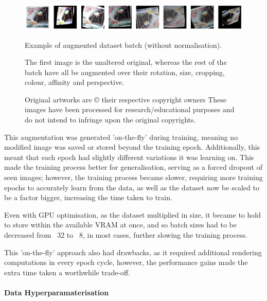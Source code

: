                         \begin{figure}[h]
                            \centering
                            \includegraphics[width=\textwidth]{images/AugmentedArts.png}
                            \caption{Example of augmented dataset batch (without normalisation).}
                            \label{fig:augmentedArts}
                            \caption*{
                                The first image is the unaltered original, whereas the rest of the batch have all be augmented over their rotation, size, cropping, colour, affinity and perspective.
                            }
                            \caption*{
                                Original artworks are © their respective copyright owners
                                \footnotesize These images have been processed for research/educational purposes and do not intend to infringe upon the original copyrights.
                            }
                        \end{figure}
    
                        This augmentation was generated 'on-the-fly' during training, meaning no modified image was saved or stored beyond the training epoch. Additionally, this meant that each epoch had slightly different variations it was learning on. This made the training process better for generalisation, serving as a forced dropout of seen images; however, the training process became slower, requiring more training epochs to accurately learn from the data, as well as the dataset now be scaled to be a factor bigger, increasing the time taken to train.
    
                        Even with GPU optimisation, as the dataset multiplied in size, it became to hold to store within the available VRAM at once, and so batch sizes had to be decreased from ~32 to ~8, in most cases, further slowing the training process.
    
                        This 'on-the-fly' approach also had drawbacks, as it required additional rendering computations in every epoch cycle, however, the performance gains made the extra time taken a worthwhile trade-off.
        
                    \paragraph{Data Hyperparamaterisation}
    
